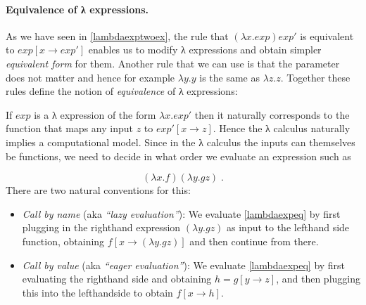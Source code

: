 \paragraph{Equivalence of λ expressions.} As we have seen in
\cref{lambdaexptwoex}, the rule that \((\lambda x. exp) exp'\) is
equivalent to \(exp[x \rightarrow exp']\) enables us to modify λ
expressions and obtain simpler \emph{equivalent form} for them. Another
rule that we can use is that the parameter does not matter and hence for
example \(\lambda y.y\) is the same as \(\lambda z.z\). Together these
rules define the notion of \emph{equivalence} of λ expressions:

\hypertarget{lambdaequivalence}{}

If \(exp\) is a λ expression of the form \(\lambda x.exp'\) then it
naturally corresponds to the function that maps any input \(z\) to
\(exp'[x \rightarrow z]\). Hence the λ calculus naturally implies a
computational model. Since in the λ calculus the inputs can themselves
be functions, we need to decide in what order we evaluate an expression
such as

\[
(\lambda x.f)(\lambda y.g z) \;. \label{lambdaexpeq}
\] There are two natural conventions for this:

\begin{itemize}
\item
  \emph{Call by name} (aka \emph{``lazy evaluation''}): We evaluate
  \eqref{lambdaexpeq} by first plugging in the righthand expression
  \((\lambda y.g z)\) as input to the lefthand side function, obtaining
  \(f[x \rightarrow (\lambda y.g z)]\) and then continue from there.
\item
  \emph{Call by value} (aka \emph{``eager evaluation''}): We evaluate
  \eqref{lambdaexpeq} by first evaluating the righthand side and
  obtaining \(h=g[y \rightarrow z]\), and then plugging this into the
  lefthandside to obtain \(f[x \rightarrow h]\).
\end{itemize}

